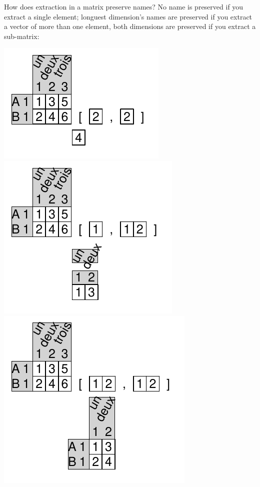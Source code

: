 \documentclass[pdflatex]{article}
\begin{document}
How does extraction in a matrix preserve names? No name is preserved if you extract a single element; longuest dimension's names are preserved if you extract a vector of more than one element, both dimensions are preserved if you extract a sub-matrix:

\includegraphics{matrix_extraction8}
\includegraphics{matrix_extraction6}
\includegraphics{matrix_extraction7}
\end{document}

